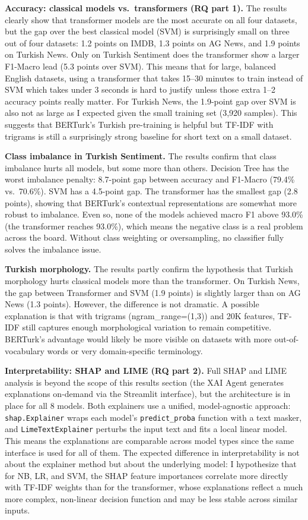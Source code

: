 \documentclass[conference]{IEEEtran}
\begin{document}
\textbf{Accuracy: classical models vs.\ transformers (RQ part 1).} The results clearly
show that transformer models are the most accurate on all four datasets, but the gap over
the best classical model (SVM) is surprisingly small on three out of four datasets: 1.2
points on IMDB, 1.3 points on AG News, and 1.9 points on Turkish News. Only on Turkish
Sentiment does the transformer show a larger F1-Macro lead (5.3 points over SVM). This
means that for large, balanced English datasets, using a transformer that takes 15--30
minutes to train instead of SVM which takes under 3 seconds is hard to justify unless those
extra 1--2 accuracy points really matter. For Turkish News, the 1.9-point gap over SVM is
also not as large as I expected given the small training set (3,920 samples). This suggests
that BERTurk's Turkish pre-training is helpful but TF-IDF with trigrams is still a
surprisingly strong baseline for short text on a small dataset.

\textbf{Class imbalance in Turkish Sentiment.} The results confirm that class imbalance
hurts all models, but some more than others. Decision Tree has the worst imbalance penalty:
8.7-point gap between accuracy and F1-Macro (79.4\% vs.\ 70.6\%). SVM has a 4.5-point gap.
The transformer has the smallest gap (2.8 points), showing that BERTurk's contextual
representations are somewhat more robust to imbalance. Even so, none of the models achieved
macro F1 above 93.0\% (the transformer reaches 93.0\%), which means the negative class is a real problem across the board.
Without class weighting or oversampling, no classifier fully solves the imbalance issue.

\textbf{Turkish morphology.} The results partly confirm the hypothesis that Turkish
morphology hurts classical models more than the transformer. On Turkish News, the gap
between Transformer and SVM (1.9 points) is slightly larger than on AG News (1.3 points).
However, the difference is not dramatic. A possible explanation is that with trigrams
(ngram\_range=(1,3)) and 20K features, TF-IDF still captures enough morphological variation
to remain competitive. BERTurk's advantage would likely be more visible on datasets with
more out-of-vocabulary words or very domain-specific terminology.

\textbf{Interpretability: SHAP and LIME (RQ part 2).} Full SHAP and LIME analysis is
beyond the scope of this results section (the XAI Agent generates explanations on-demand
via the Streamlit interface), but the architecture is in place for all 8 models. Both
explainers use a unified, model-agnostic approach: \texttt{shap.Explainer} wraps each
model's \texttt{predict\_proba} function with a text masker, and \texttt{LimeTextExplainer}
perturbs the input text and fits a local linear model. This means the explanations are
comparable across model types since the same interface is used for all of them. The
expected difference in interpretability is not about the explainer method but about the
underlying model: I hypothesize that for NB, LR, and SVM, the SHAP feature importances
correlate more directly with TF-IDF weights than for the transformer, whose explanations
reflect a much more complex, non-linear decision function and may be less stable across
similar inputs.
\end{document}
